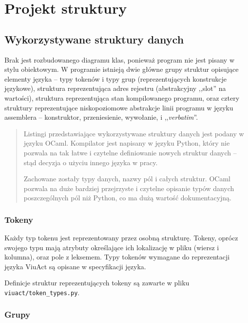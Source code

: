 \section{Projekt struktury}

\subsection{Wykorzystywane struktury danych}

Brak jest rozbudowanego diagramu klas, ponieważ program nie jest pisany w stylu obiektowym.
W programie istnieją dwie główne grupy struktur opisujące elementy języka -- typy tokenów i typy grup
(reprezentujących konstrukcje językowe), struktura reprezentująca adres rejestru (abstrakcyjny ,,slot'' na
wartości), struktura reprezentująca stan kompilowanego programu, oraz cztery struktury reprezentujące
niskopoziomowe abstrakcje linii programu w języku assemblera -- konstruktor, przeniesienie, wywołanie, i
,,\emph{verbatim}''.

\begin{quote}
    Listingi przedstawiające wykorzystywane struktury danych jest podany w języku OCaml.
    Kompilator jest napisany w języku Python, który nie pozwala na tak łatwe i czytelne definiowanie
    nowych struktur danych -- stąd decyzja o użyciu innego języka w pracy.

    Zachowane zostały typy danych, nazwy pól i całych struktur. OCaml pozwala na duże bardziej
    przejrzyste i czytelne opisanie typów danych poszczególnych pól niż Python, co ma dużą
    wartość dokumentacyjną.
\end{quote}

\subsubsection{Tokeny}
\label{diagram_klas_tokeny}

Każdy typ tokenu jest reprezentowany przez osobną strukturę. Tokeny, oprócz swojego typu mają atrybuty
określające ich lokalizację w pliku (wiersz i kolumna), oraz pole z leksemem. Typy tokenów wymagane do
reprezentacji języka ViuAct są opisane w specyfikacji języka.

Definicje struktur reprezentujących tokeny są zawarte w pliku \texttt{viuact/token\_types.py}.

\subsubsection{Grupy}
\label{diagram_klas_grupy}


